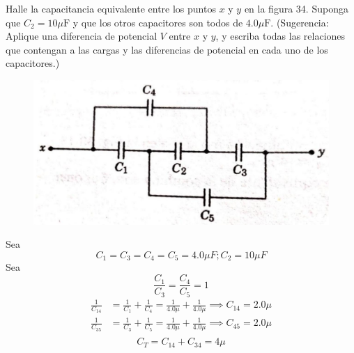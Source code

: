 \begin{problema}
    Halle la capacitancia equivalente entre los puntos $x$ y $y$ en la figura 34. Suponga que $C_{2}=10 \mu \mathrm{F}$ y que los otros capacitores son todos de $4.0 \mu \mathrm{F}$. (Sugerencia: Aplique una diferencia de potencial $V$ entre $x$ y $y$, y escriba todas las relaciones que contengan a las cargas y las diferencias de potencial en cada uno de los capacitores.)
    \begin{figure}[H]
        \centering
        \includegraphics[scale=0.3]{imagenes/2.jpg}
    \end{figure}
    \begin{sol}
        Sea 
        $$C_1=C_3=C_4=C_5=4.0\mu F; C_2=10\mu F $$
        Sea 
        $$\frac{C_1}{C_3}=\frac{C_4}{C_5}=1$$
        \begin{align*}
            \frac{1}{C_{14}} &= \frac{1}{C_1}+\frac{1}{C_4} = \frac{1}{4.0\mu}+\frac{1}{4.0\mu}\implies C_{14} = 2.0\mu\\
            \frac{1}{C_{35}} &= \frac{1}{C_3}+\frac{1}{C_5} = \frac{1}{4.0\mu}+\frac{1}{4.0\mu}\implies C_{45} = 2.0\mu\\
        \end{align*}
        $$C_T= C_{14}+C_{34}=4\mu$$
    \end{sol}
\end{problema}

